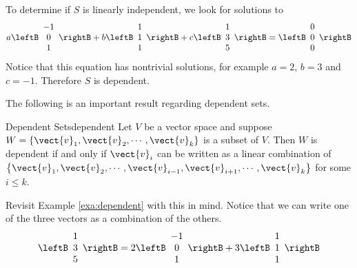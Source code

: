 \begin{solution}
To determine if $S$ is linearly independent, we look for solutions to
\[ 
a\leftB\begin{array}{c} -1 \\ 0 \\ 1 \end{array}\rightB
+b\leftB\begin{array}{c} 1 \\ 1 \\ 1 \end{array}\rightB
+c\leftB\begin{array}{c} 1 \\ 3 \\ 5 \end{array}\rightB
=\leftB\begin{array}{c} 0 \\ 0 \\ 0 \end{array}\rightB
\]
Notice that this equation has nontrivial solutions, 
for example $a=2$, $b=3$ and $c=-1$. Therefore $S$ is dependent. 
\end{solution}

The following is an important result regarding dependent sets.

\begin{lemma}{Dependent Sets}{dependent}
Let $V$ be a vector space and suppose $W = \left\{ \vect{v}_1, \vect{v}_2, \cdots, \vect{v}_k \right\}$ is a subset of $V$. Then $W$ is dependent if and only if $\vect{v}_i$ can be written as a linear combination of $\left\{ \vect{v}_1, \vect{v}_2, \cdots, \vect{v}_{i-1}, \vect{v}_{i+1}, \cdots,  \vect{v}_k \right\}$ for some $i \leq k$. 
\end{lemma}

Revisit Example \ref{exa:dependent} with this in mind. Notice that we can write one of the three vectors as a combination of the others.
\[
\leftB\begin{array}{c} 1 \\ 3 \\ 5 \end{array}\rightB
=
2\leftB\begin{array}{c} -1 \\ 0 \\ 1 \end{array}\rightB
+3\leftB\begin{array}{c} 1 \\ 1 \\ 1 \end{array}\rightB
\]

